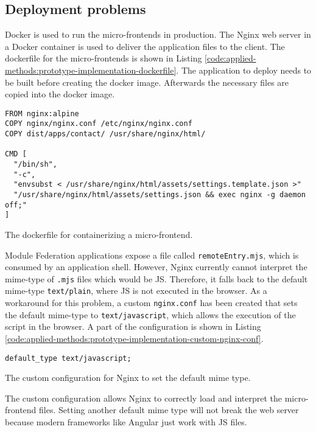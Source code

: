 \subsection{Deployment problems}\label{subsection:applied-methods:prototypical-implementation:nginx-problems}

Docker is used to run the micro-frontends in production. The Nginx web server in a Docker container is used to deliver the application files to the client. The dockerfile for the micro-frontends is shown in Listing \ref{code:applied-methods:prototype-implementation-dockerfile}. The application to deploy needs to be built before creating the docker image. Afterwards the necessary files are copied into the docker image.

\ifshowListings
  \begin{listing}[H]
  \begin{verbatim}
FROM nginx:alpine
COPY nginx/nginx.conf /etc/nginx/nginx.conf
COPY dist/apps/contact/ /usr/share/nginx/html/
    
CMD [
  "/bin/sh", 
  "-c", 
  "envsubst < /usr/share/nginx/html/assets/settings.template.json >" 
  "/usr/share/nginx/html/assets/settings.json && exec nginx -g daemon off;"
]
  \end{verbatim}
  \caption{The dockerfile for containerizing a micro-frontend.}\label{code:applied-methods:prototype-implementation-dockerfile}
  \end{listing}
\fi

\noindent Module Federation applications expose a file called \texttt{remoteEntry.mjs}, which is consumed by an application shell. However, Nginx currently cannot interpret the mime-type of \texttt{\*.mjs} files which would be \ac{JS}. Therefore, it falls back to the default mime-type \texttt{text/plain}, where \ac{JS} is not executed in the browser. As a workaround for this problem, a custom \texttt{nginx.conf} has been created that sets the default mime-type to \texttt{text/javascript}, which allows the execution of the script in the browser. A part of the configuration is shown in Listing \ref{code:applied-methods:prototype-implementation-custom-nginx-conf}.

\ifshowListings
  \begin{listing}[H]
  \begin{verbatim}
default_type text/javascript;
  \end{verbatim}
  \caption{The custom configuration for Nginx to set the default mime type.}\label{code:applied-methods:prototype-implementation-custom-nginx-conf}
  \end{listing}
\fi

\noindent The custom configuration allows Nginx to correctly load and interpret the micro-frontend files. Setting another default mime type will not break the web server because modern frameworks like Angular just work with \ac{JS} files.
